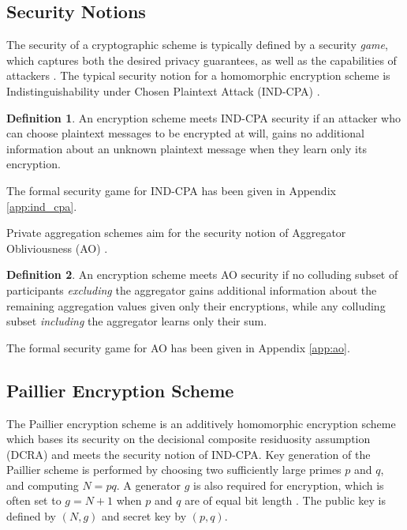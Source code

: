 \documentclass[twocolumn]{autart}
\theoremstyle{definition}
\newtheorem{definition}{Definition}
\theoremstyle{remark}
\begin{document}
\subsection{Security Notions}
The security of a cryptographic scheme is typically defined by a security \textit{game}, which captures both the desired privacy guarantees, as well as the capabilities of attackers \cite{katzIntroductionModernCryptography2008}. The typical security notion for a homomorphic encryption scheme is Indistinguishability under Chosen Plaintext Attack (IND-CPA) \cite{chaseSecurityHomomorphicEncryption2017}. 
\begin{definition}
An encryption scheme meets IND-CPA security if an attacker who can choose plaintext messages to be encrypted at will, gains no additional information about an unknown plaintext message when they learn only its encryption. 

The formal security game for IND-CPA has been given in Appendix \ref{app:ind_cpa}.
\end{definition}
Private aggregation schemes aim for the security notion of Aggregator Obliviousness (AO) \cite{shiPrivacyPreservingAggregationTimeSeries2011}. 
\begin{definition}
An encryption scheme meets AO security if no colluding subset of participants \textit{excluding} the aggregator gains additional information about the remaining aggregation values given only their encryptions, while any colluding subset \textit{including} the aggregator learns only their sum. 

The formal security game for AO has been given in Appendix \ref{app:ao}.
\end{definition}

% 
% 

\subsection{Paillier Encryption Scheme} \label{subsec:paillier_scheme}
The Paillier encryption scheme \cite{paillierPublicKeyCryptosystemsBased1999} is an additively homomorphic encryption scheme which bases its security on the decisional composite residuosity assumption (DCRA) and meets the security notion of IND-CPA. Key generation of the Paillier scheme is performed by choosing two sufficiently large primes $p$ and $q$, and computing $N=pq$. A generator $g$ is also required for encryption, which is often set to $g=N+1$ when $p$ and $q$ are of equal bit length \cite{katzIntroductionModernCryptography2008}. The public key is defined by $(N, g)$ and secret key by $(p, q)$.
\end{document}

